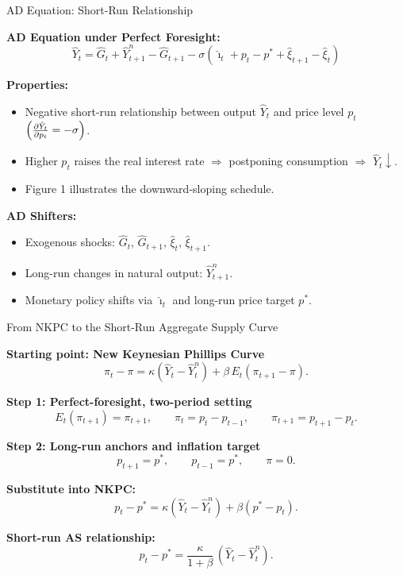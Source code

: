\documentclass[11pt,aspectratio=169]{beamer}
\begin{document}
\begin{frame}[label=ADRelation]{AD Equation: Short-Run Relationship}
\small

\textbf{AD Equation under Perfect Foresight:}
\begin{equation}
\hat{Y}_{t}=\hat{G}_{t}+\hat{Y}_{t+1}^{n}-\hat{G}_{t+1}-\sigma \left( 
\hat{\imath}_{t}+p_{t}-p^{\ast }+\hat{\xi}_{t+1}-\hat{\xi}_{t}\right)
\label{ADsimple}
\end{equation}

\textbf{Properties:}
\begin{itemize}
\item Negative short-run relationship between output $\hat{Y}_{t}$ and price level $p_{t}$ $\Bigl( \frac{\partial \hat{Y}_t}{\partial p_t}=-\sigma\Bigr)$.
\item  Higher $p_t$ raises the real interest rate $\Rightarrow$ postponing consumption $\Rightarrow$ $\hat{Y}_t\downarrow$.
\item Figure 1 illustrates the downward-sloping schedule.
\end{itemize}

\textbf{AD Shifters:}
\begin{itemize}
\item Exogenous shocks: $\hat{G}_{t}$, $\hat{G}_{t+1}$, $\hat{\xi}_{t}$, $\hat{\xi}_{t+1}$.
\item Long-run changes in natural output: $\hat{Y}_{t+1}^{n}$.
\item Monetary policy shifts via $\hat{\imath}_{t}$ and long-run price target $p^{\ast}$.
\end{itemize}
\end{frame}

\begin{frame}{From NKPC to the Short-Run Aggregate Supply Curve}
\small

\textbf{Starting point: New Keynesian Phillips Curve}
\[
\pi_t - \pi
=
\kappa(\hat{Y}_t - \hat{Y}_t^{n})
+
\beta\, E_t(\pi_{t+1}-\pi).
\]

\vspace{0.25cm}

\textbf{Step 1: Perfect-foresight, two-period setting}
\[
E_t(\pi_{t+1}) = \pi_{t+1}, 
\qquad 
\pi_t = p_t - p_{t-1},
\qquad 
\pi_{t+1} = p_{t+1} - p_t.
\]

\textbf{Step 2: Long-run anchors and inflation target}
\[
p_{t+1} = p^{\ast}, 
\qquad 
p_{t-1} = p^{\ast},
\qquad 
\pi = 0.
\]

\vspace{0.25cm}

\textbf{Substitute into NKPC:}
\[
p_t - p^{\ast}
=
\kappa(\hat{Y}_t - \hat{Y}_t^{n})
+
\beta (p^{\ast} - p_t).
\]

\textbf{Short-run AS relationship:}
\[
p_t - p^{\ast}
=
\frac{\kappa}{1+\beta}\,(\hat{Y}_t - \hat{Y}_t^{n}).
\]

\end{frame}
\end{document}
